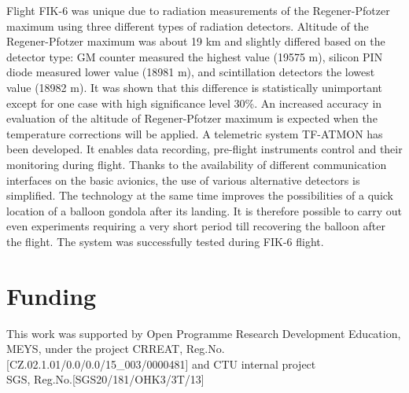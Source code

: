 \documentclass{Rpd}
\begin{document}
Flight FIK-6 was unique due to radiation measurements of the Regener-Pfotzer maximum using three different types of radiation detectors. Altitude of the Regener-Pfotzer maximum was about 19 km and slightly differed based on the detector type: GM counter measured the highest value (19575 m), silicon PIN diode measured lower value (18981 m), and scintillation detectors the lowest value (18982 m). It was shown that this difference is statistically unimportant except for one case with high significance level 30\%. An increased accuracy in evaluation of the altitude of Regener-Pfotzer maximum is expected when the temperature corrections will be applied.
A telemetric system TF-ATMON has been developed. It enables data recording, pre-flight instruments control and their monitoring during flight. Thanks to the availability of different communication interfaces on the basic avionics, the use of various alternative detectors is simplified. The technology at the same time improves the possibilities of a quick location of a balloon gondola after its landing. It is therefore possible to carry out even experiments requiring a very short period till recovering the balloon after the flight. The system was successfully tested during FIK-6 flight.

\section*{Funding}

This work was supported by Open Programme Research Development Education, MEYS, under the project CRREAT, \newline Reg.No.[CZ.02.1.01/0.0/0.0/15\_003/0000481] and CTU internal project \\ SGS, Reg.No.[SGS20/181/OHK3/3T/13]
\end{document}
